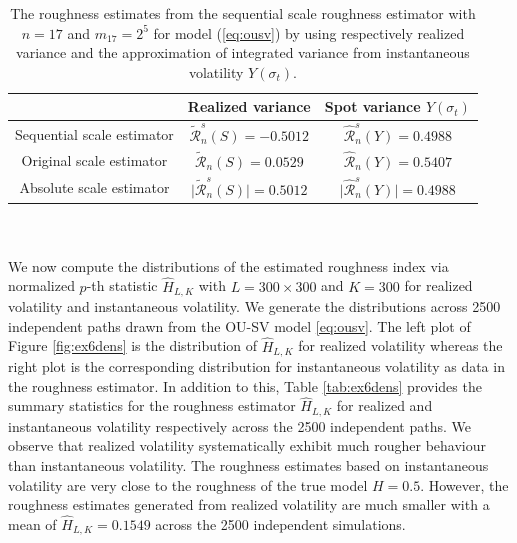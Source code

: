 \documentclass{article}
\begin{document}
\begin{table}[htbp]
    \centering
    \begin{tabular}{ccc}
        \toprule
         & Realized variance & Spot variance $Y(\sigma_t)$ \\
        \midrule
        Sequential scale estimator & $\widetilde{\mathscr{R}}_n^s (S) = -0.5012 $ & $\widehat{\mathscr{R}}_n^s (Y) = 0.4988$ \\
        Original scale estimator &$\widetilde{\mathscr{R}}_n (S) = 0.0529 $ & $\widehat{\mathscr{R}}_n (Y) = 0.5407$ \\
        Absolute scale estimator &$\lvert \widetilde{\mathscr{R}}_n^s (S)\rvert = 0.5012 $ & $\lvert \widehat{\mathscr{R}}_n^s (Y)\rvert = 0.4988$ \\
        \bottomrule
    \end{tabular}
    \caption{The roughness estimates from the sequential scale roughness estimator with $n=17$ and $m_{17}=2^5$ for model (\ref{eq:ousv}) by using respectively realized variance and the approximation of integrated variance from instantaneous volatility $Y(\sigma_t)$.}
    \label{tab:ex6scaleest}
\end{table}\\\\
We now compute the distributions of the estimated roughness index via normalized $p$-th statistic $\hat{H}_{L,K}$ with $L=300\times 300$ and $K=300$ for realized volatility and instantaneous volatility. We generate the distributions across 2500 independent paths drawn from the OU-SV model \eqref{eq:ousv}. The left plot of Figure \ref{fig:ex6dens} is the distribution of $\hat{H}_{L,K}$ for realized volatility whereas the right plot is the corresponding distribution for instantaneous volatility as data in the roughness estimator. In addition to this, Table \ref{tab:ex6dens} provides the summary statistics for the roughness estimator $\hat{H}_{L,K}$ for realized and instantaneous volatility respectively across the 2500 independent paths. We observe that realized volatility systematically exhibit much rougher behaviour than instantaneous volatility. The roughness estimates based on instantaneous volatility are very close to the roughness of the true model $H=0.5$. However, the roughness estimates generated from realized volatility are much smaller with a mean of $\hat{H}_{L,K}=0.1549$ across the 2500 independent simulations.
\end{document}
